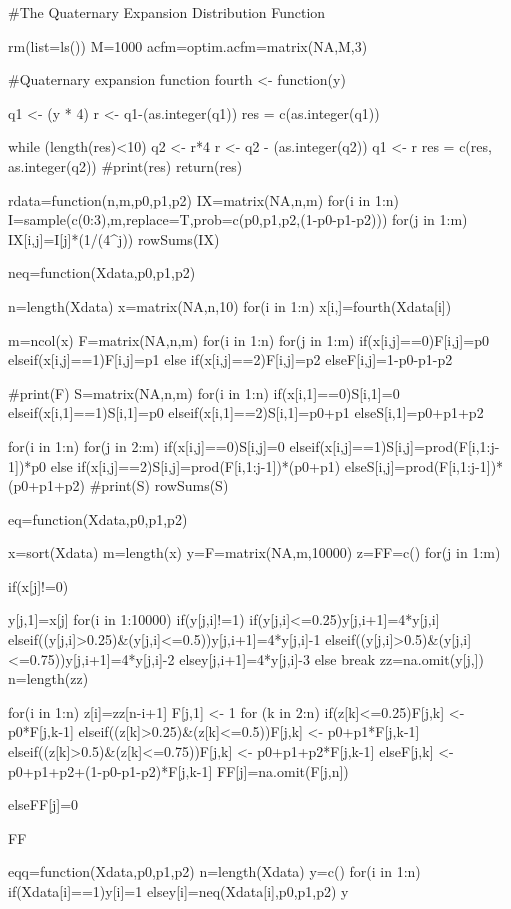 #The Quaternary Expansion Distribution Function

rm(list=ls())
M=1000
acfm=optim.acfm=matrix(NA,M,3)

#Quaternary expansion function
fourth <- function(y) {
  q1 <- (y * 4) 
  r <- q1-(as.integer(q1))
  res = c(as.integer(q1))

  while (length(res)<10) {
   q2 <- r*4
   r <- q2 - (as.integer(q2))
   q1 <- r
   res = c(res, as.integer(q2))
#print(res)
  }
  return(res)
}

rdata=function(n,m,p0,p1,p2){
IX=matrix(NA,n,m)
for(i in 1:n){
I=sample(c(0:3),m,replace=T,prob=c(p0,p1,p2,(1-p0-p1-p2)))
for(j in 1:m){
IX[i,j]=I[j]*(1/(4^j))
}
}
rowSums(IX)
}

neq=function(Xdata,p0,p1,p2){
n=length(Xdata)
x=matrix(NA,n,10)
for(i in 1:n)
{
x[i,]=fourth(Xdata[i])
}

m=ncol(x)
F=matrix(NA,n,m)
for(i in 1:n)
{
for(j in 1:m)
{
if(x[i,j]==0){F[i,j]=p0}
  else{if(x[i,j]==1){F[i,j]=p1}
   else {if(x[i,j]==2){F[i,j]=p2}
        else{F[i,j]=1-p0-p1-p2
  }
}
}
}
}

#print(F)
S=matrix(NA,n,m)
for(i in 1:n)
{
if(x[i,1]==0){S[i,1]=0}
    else{if(x[i,1]==1){S[i,1]=p0}
    else{if(x[i,1]==2){S[i,1]=p0+p1} 
      else{S[i,1]=p0+p1+p2}
}
}
}

for(i in 1:n)
{
for(j in 2:m)
{
if(x[i,j]==0){S[i,j]=0}
   else{if(x[i,j]==1){S[i,j]=prod(F[i,1:j-1])*p0}
   else {if(x[i,j]==2){S[i,j]=prod(F[i,1:j-1])*(p0+p1)}
    else{S[i,j]=prod(F[i,1:j-1])*(p0+p1+p2)}
}
}
}
}
#print(S)
rowSums(S)
}

eq=function(Xdata,p0,p1,p2){
x=sort(Xdata)
m=length(x)
y=F=matrix(NA,m,10000)
z=FF=c()
for(j in 1:m)
{
if(x[j]!=0){
y[j,1]=x[j]
for(i in 1:10000){
if(y[j,i]!=1){
if(y[j,i]<=0.25){y[j,i+1]=4*y[j,i]}
else{if((y[j,i]>0.25)&(y[j,i]<=0.5)){y[j,i+1]=4*y[j,i]-1}
     else{if((y[j,i]>0.5)&(y[j,i]<=0.75)){y[j,i+1]=4*y[j,i]-2}
          else{y[j,i+1]=4*y[j,i]-3
}
}
}
}
else{
break
}
}
zz=na.omit(y[j,])
n=length(zz)

for(i in 1:n){
  z[i]=zz[n-i+1]
    }
F[j,1] <- 1
for (k in 2:n) {
if(z[k]<=0.25){F[j,k] <- p0*F[j,k-1]}
else{if((z[k]>0.25)&(z[k]<=0.5)){F[j,k] <- p0+p1*F[j,k-1]}
     else{if((z[k]>0.5)&(z[k]<=0.75)){F[j,k] <- p0+p1+p2*F[j,k-1]}
          else{F[j,k] <-p0+p1+p2+(1-p0-p1-p2)*F[j,k-1]
}
}
}
}
FF[j]=na.omit(F[j,n])
}
else{FF[j]=0}
}
FF
}

eqq=function(Xdata,p0,p1,p2){
n=length(Xdata)
y=c()
for(i in 1:n)
{
if(Xdata[i]==1){y[i]=1}
else{y[i]=neq(Xdata[i],p0,p1,p2)
}
}
y
}

